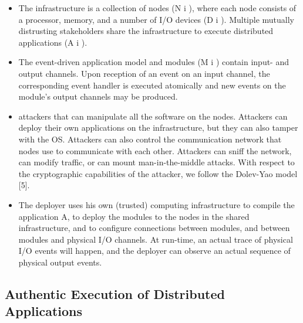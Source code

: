\documentclass{article}
\begin{document}
\begin{itemize}
\item The infrastructure is a collection of nodes (N i ), where each node consists of a processor, memory, and a number of I/O devices (D i ). Multiple mutually distrusting stakeholders share the infrastructure to execute distributed applications (A i ).
\item The event-driven application model and modules (M i ) contain input- and output channels. Upon reception of an event on an input channel, the corresponding event handler is executed atomically and new events on the module’s output channels may be produced.
\item attackers that can manipulate all the software on the nodes. Attackers can deploy their own applications on the infrastructure, but they can also tamper with the OS. Attackers can also control the communication network that nodes use to communicate with each other. Attackers can sniff the network, can modify traffic, or can mount man-in-the-middle attacks. With respect to the cryptographic capabilities of the attacker, we follow the Dolev-Yao model [5].
\item The deployer uses his own (trusted) computing infrastructure to compile the application A, to deploy the modules to the nodes in the shared infrastructure, and to configure connections between modules, and between modules and physical I/O channels. At run-time, an actual trace of physical I/O events will happen, and the deployer can observe an actual sequence of physical output events.
\end{itemize}

\subsection{Authentic Execution of Distributed Applications}
\end{document}
